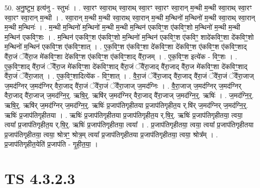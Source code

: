 \documentclass[17pt]{extarticle}
\begin{document}
50. अ॒नु॒ष्टुभ॒ इत्य॑नु - स्तुभः॑ । . स्वा॒रꣳ स्वा॒राथ् स्वा॒राथ् स्वा॒रꣳ स्वा॒रꣳ स्वा॒रान् म॒न्थी म॒न्थी स्वा॒राथ् स्वा॒रꣳ स्वा॒रꣳ स्वा॒रान् म॒न्थी । . स्वा॒रान् म॒न्थी म॒न्थी स्वा॒राथ् स्वा॒रान् म॒न्थी म॒न्थिनो॑ म॒न्थिनो॑ म॒न्थी स्वा॒राथ् स्वा॒रान् म॒न्थी म॒न्थिनः॑ । . म॒न्थी म॒न्थिनो॑ म॒न्थिनो॑ म॒न्थी म॒न्थी म॒न्थिन॑ एकविꣳ॒॒श ए॑कविꣳ॒॒शो म॒न्थिनो॑ म॒न्थी म॒न्थी म॒न्थिन॑ एकविꣳ॒॒शः । . म॒न्थिन॑ एकविꣳ॒॒श ए॑कविꣳ॒॒शो म॒न्थिनो॑ म॒न्थिन॑ एकविꣳ॒॒श ए॑कविꣳ॒॒ शादे॑कविꣳ॒॒शा दे॑कविꣳ॒॒शो म॒न्थिनो॑ म॒न्थिन॑ एकविꣳ॒॒श ए॑कविꣳ॒॒शात् । . ए॒क॒विꣳ॒॒श ए॑कविꣳ॒॒शा दे॑कविꣳ॒॒शा दे॑कविꣳ॒॒श ए॑कविꣳ॒॒श ए॑कविꣳ॒॒शाद् वै॑रा॒जं ॅवै॑रा॒ज मे॑कविꣳ॒॒शा दे॑कविꣳ॒॒श ए॑कविꣳ॒॒श ए॑कविꣳ॒॒शाद् वै॑रा॒जम् । . ए॒क॒विꣳ॒॒श इत्ये॑क - विꣳ॒॒शः । . ए॒क॒विꣳ॒॒शाद् वै॑रा॒जं ॅवै॑रा॒ज मे॑कविꣳ॒॒शा दे॑कविꣳ॒॒शाद् वै॑रा॒जं ॅवै॑रा॒जाद् वै॑रा॒जाद् वै॑रा॒ज मे॑कविꣳ॒॒शा दे॑कविꣳ॒॒शाद् वै॑रा॒जं ॅवै॑रा॒जात् । . ए॒क॒विꣳ॒॒शादित्ये॑क - विꣳ॒॒शात् । . वै॒रा॒जं ॅवै॑रा॒जाद् वै॑रा॒जाद् वै॑रा॒जं ॅवै॑रा॒जं ॅवै॑रा॒जाज् ज॒मद॑ग्निर् ज॒मद॑ग्निर् वैरा॒जाद् वै॑रा॒जं ॅवै॑रा॒जं ॅवै॑रा॒जाज् ज॒मद॑ग्निः । . वै॒रा॒जाज् ज॒मद॑ग्निर् ज॒मद॑ग्निर् वैरा॒जाद् वै॑रा॒जाज् ज॒मद॑ग्नि॒र्॒. ऋषि॒र्॒. ऋषि॑र् ज॒मद॑ग्निर् वैरा॒जाद् वै॑रा॒जाज् ज॒मद॑ग्नि॒र्॒. ऋषिः॑ । . ज॒मद॑ग्नि॒र्॒. ऋषि॒र्॒. ऋषि॑र् ज॒मद॑ग्निर् ज॒मद॑ग्नि॒र्॒. ऋषिः॑ प्र॒जाप॑तिगृहीतया प्र॒जाप॑तिगृहीत॒य र्.षि॑र् ज॒मद॑ग्निर् ज॒मद॑ग्नि॒र्॒. ऋषिः॑ प्र॒जाप॑तिगृहीतया । . ऋषिः॑ प्र॒जाप॑तिगृहीतया प्र॒जाप॑तिगृहीत॒य र्.षि॒र्॒. ऋषिः॑ प्र॒जाप॑तिगृहीतया॒ त्वया॒ त्वया᳚ प्र॒जाप॑तिगृहीत॒य र्.षि॒र्॒. ऋषिः॑ प्र॒जाप॑तिगृहीतया॒ त्वया᳚ । . प्र॒जाप॑तिगृहीतया॒ त्वया॒ त्वया᳚ प्र॒जाप॑तिगृहीतया प्र॒जाप॑तिगृहीतया॒ त्वया॒ श्रोत्रꣳ॒॒ श्रोत्र॒म् त्वया᳚ प्र॒जाप॑तिगृहीतया प्र॒जाप॑तिगृहीतया॒ त्वया॒ श्रोत्र᳚म् । . प्र॒जाप॑तिगृहीत॒येति॑ प्र॒जाप॑ति - गृ॒ही॒त॒या॒ । \newline
\pagebreak
{}

\section{ TS 4.3.2.3 }
\end{document}
